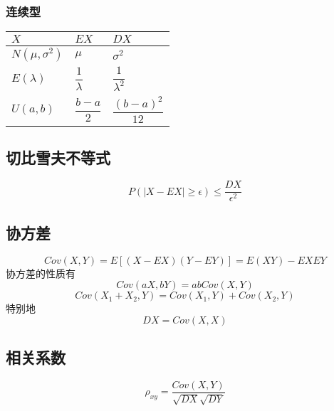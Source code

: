 \subsubsection{连续型}

\begin{table}[H]
  \renewcommand\arraystretch{2}
  \begin{tabular}{|l|l|l|}
    \hline
    $X$&$EX$&$DX$\\
    \hline
    $N(\mu,\sigma^{2})$&$\mu$&$\sigma^{2}$\\
    \hline
    $E(\lambda)$&$\dfrac{1}{\lambda}$&$\dfrac{1}{\lambda^{2}}$\\
    \hline
    $U(a,b)$&$\dfrac{b-a}{2}$&$\dfrac{(b-a)^{2}}{12}$\\
    \hline
  \end{tabular}
\end{table}

\subsection{切比雪夫不等式}

\begin{equation*}
  P \left( |X-EX| \geq \epsilon \right) \leq \dfrac{DX}{\epsilon^{2}}
\end{equation*}

\subsection{协方差}

\begin{equation*}
  Cov(X,Y)=E \left[ \left( X-EX \right) \left( Y-EY \right) \right] = E \left( XY \right) -EXEY
\end{equation*}
协方差的性质有
\begin{equation*}
  Cov(aX,bY)=ab Cov(X,Y)
\end{equation*}
\begin{equation*}
  Cov(X_{1}+X_{2} ,Y) = Cov(X_{1},Y) + Cov(X_{2},Y)
\end{equation*}
特别地
\begin{equation*}
  DX=Cov(X,X)
\end{equation*}

\subsection{相关系数}

\begin{equation*}
  \rho_{xy} = \dfrac{Cov(X,Y)}{\sqrt{DX} \sqrt{DY}}
\end{equation*}

